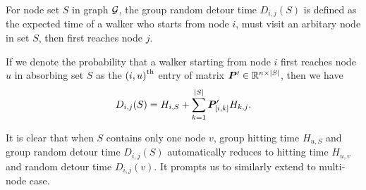 \documentclass[sigconf]{acmart}
\begin{document}
For node set \(S\) in graph \(\mathcal{G}\), the group random detour time \(D_{i,j}(S)\) is defined as the expected time of a walker who starts from node \(i\), must visit an arbitary node in set \(S\), then first reaches node \(j\).

\begin{definition}\label{def:detour-multiple}
  If we denote the probability that a walker starting from node \(i\) first reaches node \(u\) in absorbing set \(S\) as the \({(i,u)}^{\rm{th}}\) entry of matrix \(\boldsymbol{P}'\in\mathbb{R}^{n\times\left|S \right|}\), then we have
  \[D_{i,j}(S)= H_{i,S}+\sum_{k=1}^{\left|S \right|}\boldsymbol{P}'_{[i,k]}H_{k,j}.\]
\end{definition}

It is clear that when \(S\) contains only one node \(v\), group hitting time \(H_{u,S}\) and group random detour time \(D_{i,j}(S)\) automatically reduces to hitting time \(H_{u,v}\) and random detour time \(D_{i,j}(v)\).
It prompts us to similarly extend  to multi-node case.
\end{document}
